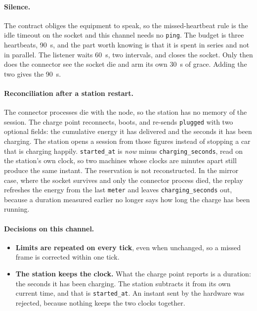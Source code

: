 \paragraph{Silence.} The contract obliges the equipment to speak, so the missed-heartbeat
rule is the idle timeout on the socket and this channel needs no \texttt{ping}.
The budget is three heartbeats, 90~s, and the part worth knowing is that it is spent in
series and not in parallel. The listener waits 60~s, two intervals, and closes the socket.
Only then does the connector see the socket die and arm its own 30~s of grace. Adding the
two gives the 90~s.

\paragraph{Reconciliation after a station restart.} The connector processes die with the
node, so the station has no memory of the session. The charge point reconnects, boots, and
re-sends \texttt{plugged} with two optional fields: the cumulative energy it has delivered
and the seconds it has been charging. The station opens a session from those figures instead
of stopping a car that is charging happily. \texttt{started\_at} is \emph{now} minus
\texttt{charging\_seconds}, read on the station's own clock, so two machines whose clocks are
minutes apart still produce the same instant. The reservation is not reconstructed.
In the mirror case, where the socket survives and only the connector process died, the replay
refreshes the energy from the last \texttt{meter} and leaves \texttt{charging\_seconds} out,
because a duration measured earlier no longer says how long the charge has been running.

\paragraph{Decisions on this channel.}
\begin{itemize}
  \item \textbf{Limits are repeated on every tick}, even when unchanged, so a missed frame is corrected within one tick. 
  \item \textbf{The station keeps the clock.} What the charge point reports is a duration: the seconds it has been charging. The station subtracts it from its own current time, and that is \texttt{started\_at}. An instant sent by the hardware was rejected, because nothing keeps the two clocks together.
\end{itemize}

